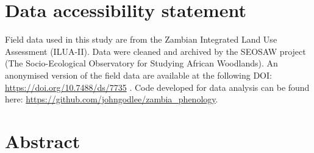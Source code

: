 \documentclass[11pt,a4paper]{article}
\begin{document}
\section*{Data accessibility statement}

Field data used in this study are from the Zambian Integrated Land Use
Assessment (ILUA-II). Data were cleaned and archived by the SEOSAW project (The
Socio-Ecological Observatory for Studying African Woodlands). An anonymised
version of the field data are available at the following DOI:
\url{https://doi.org/10.7488/ds/7735} \citep{Godlee2024}. Code developed for data analysis can be
found here: \url{https://github.com/johngodlee/zambia_phenology}.

\newpage{}
\linenumbers

\section*{Abstract}
\end{document}
